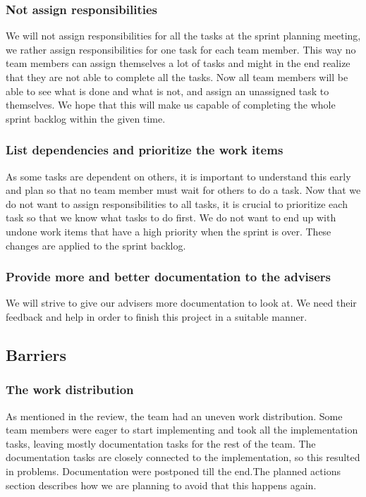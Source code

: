 \subsubsection{Not assign responsibilities}
We will not assign responsibilities for all the tasks at the sprint planning meeting, we rather assign responsibilities for one task for each team member. This way no team members can assign themselves a lot of tasks and might in the end realize that they are not able to complete all the tasks. Now all team members will be able to see what is done and what is not, and assign an unassigned task to themselves. We hope that this will make us capable of completing the whole sprint backlog within the given time.

\subsubsection{List dependencies and prioritize the work items}
As some tasks are dependent on others, it is important to understand this early and plan so that no team member must wait for others to do a task. Now that we do not want to assign responsibilities to all tasks, it is crucial to prioritize each task so that we know what tasks to do first. We do not want to end up with undone work items that have a high priority when the sprint is over. These changes are applied to the sprint backlog.

\subsubsection{Provide more and better documentation to the advisers}
We will strive to give our advisers more documentation to look at. We need their feedback and help in order to finish this project in a suitable manner. 


\subsection{Barriers}
\subsubsection{The work distribution} 
As mentioned in the review, the team had an uneven work distribution. Some team members were eager to start implementing and took all the implementation tasks, leaving mostly documentation tasks for the rest of the team. The documentation tasks are closely connected to the implementation, so this resulted in problems. Documentation were postponed till the end.The planned actions section describes how we are planning to avoid that this happens again. 


